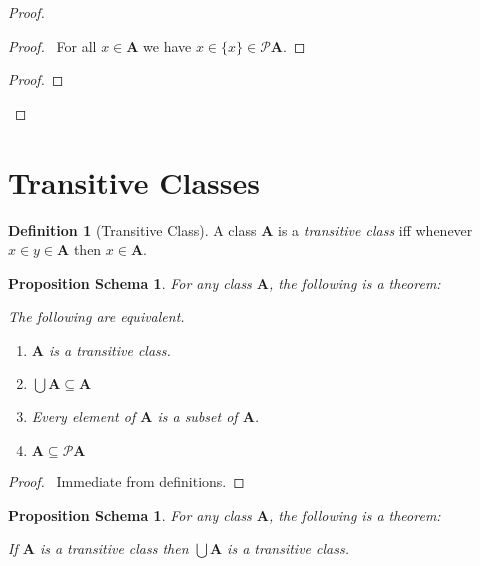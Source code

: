 \documentclass{book}
\let\qed\relax
\newtheorem{props}[ax]{Proposition Schema}
\theoremstyle{definition}
\newtheorem{df}[ax]{Definition}
\begin{document}
\begin{proof}
\pf
{}
\begin{proof}
	\pf\ For all $x \in \mathbf{A}$ we have $x \in \{x\} \in \mathcal{P} \mathbf{A}$.
\end{proof}
\begin{proof}
\end{proof}
\qed
\end{proof}

\section{Transitive Classes}

\begin{df}[Transitive Class]
A class $\mathbf{A}$ is a \emph{transitive class} iff whenever $x \in y \in \mathbf{A}$ then $x \in \mathbf{A}$.
\end{df}

\begin{props}
\label{prop:transitiveset}
For any class $\mathbf{A}$, the following is a theorem:

The following are equivalent.
\begin{enumerate}
\item
$\mathbf{A}$ is a transitive class.
\item
$\bigcup \mathbf{A} \subseteq \mathbf{A}$
\item
Every element of $\mathbf{A}$ is a subset of $\mathbf{A}$.
\item
$\mathbf{A} \subseteq \mathcal{P} \mathbf{A}$
\end{enumerate}
\end{props}

\begin{proof}
\pf\ Immediate from definitions. \qed
\end{proof}

\begin{props}
\label{prop:uniontransitive}
For any class $\mathbf{A}$, the following is a theorem:

If $\mathbf{A}$ is a transitive class then $\bigcup \mathbf{A}$ is a transitive class.
\end{props}
\end{document}
